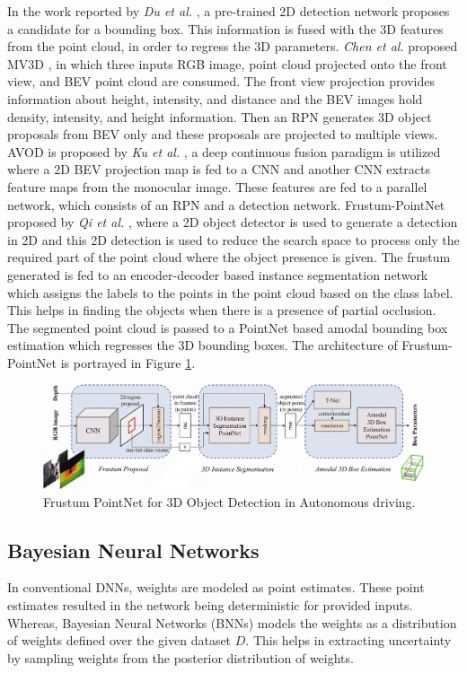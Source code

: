 \documentclass[10pt,twocolumn,letterpaper]{article}
\begin{document}
In the work reported by \textit{Du et al.} \cite{Du2018}, a pre-trained 2D detection network proposes a candidate for a bounding box. This information is fused with the 3D features from the point cloud, in order to regress the 3D parameters. \textit{Chen et al.} proposed MV3D \cite{MV3D2017}, in which three inputs RGB image, point cloud projected onto the front view, and BEV point cloud are consumed. The front view projection provides information about height, intensity, and distance and the BEV images hold density, intensity, and height information. Then an RPN generates 3D object proposals from BEV only and these proposals are projected to multiple views. AVOD is proposed by \textit{Ku et al.} \cite{AVOD2018}, a deep continuous fusion paradigm is utilized where a 2D BEV projection map is fed to a CNN and another CNN extracts feature maps from the monocular image. These features are fed to a parallel network, which consists of an RPN and a detection network. Frustum-PointNet proposed by \textit{Qi et al.} \cite{FPointnet2018}, where a 2D object detector is used to generate a detection in 2D and this 2D detection is used to reduce the search space to process only the required part of the point cloud where the object presence is given. The frustum generated is fed to an encoder-decoder based instance segmentation network which assigns the labels to the points in the point cloud based on the class label. This helps in finding the objects when there is a presence of partial occlusion. The segmented point cloud is passed to a PointNet \cite{Pointnet2017} based amodal bounding box estimation which regresses the 3D bounding boxes. The architecture of Frustum-PointNet \cite{FPointnet2018} is portrayed in Figure \ref{fig:frustumpointnet}.

\begin{figure}
	\centering
	\includegraphics[scale = 0.25]{images/Frustum_PointNet.png}
	\caption{Frustum PointNet for 3D Object Detection in Autonomous driving.}
	\label{fig:frustumpointnet}
\end{figure}

\subsection{Bayesian Neural Networks}
In conventional DNNs, weights are modeled as point estimates. These point estimates resulted in the network being deterministic for provided inputs. Whereas, Bayesian Neural Networks (BNNs) models the weights as a distribution of weights defined over the given dataset $D$. This helps in extracting uncertainty by sampling weights from the posterior distribution of weights.
\end{document}
